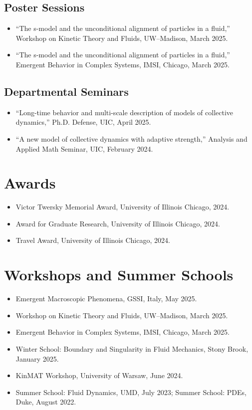 \documentclass[10pt]{article}
\begin{document}
\subsection*{Poster Sessions}
\begin{itemize}
  \item ``The s-model and the unconditional alignment of particles in a fluid,'' Workshop on Kinetic Theory and Fluids, UW--Madison, March 2025.
  \item ``The s-model and the unconditional alignment of particles in a fluid,'' Emergent Behavior in Complex Systems, IMSI, Chicago, March 2025.
\end{itemize}

\subsection*{Departmental Seminars}
\begin{itemize}
  \item ``Long-time behavior and multi-scale description of models of collective dynamics,'' Ph.D. Defense, UIC, April 2025.
  \item ``A new model of collective dynamics with adaptive strength,'' Analysis and Applied Math Seminar, UIC, February 2024.
\end{itemize}

\section*{Awards}
\begin{itemize}
  \item Victor Twersky Memorial Award, University of Illinois Chicago, 2024.
  \item Award for Graduate Research, University of Illinois Chicago, 2024.
  \item Travel Award, University of Illinois Chicago, 2024.
\end{itemize}

\section*{Workshops and Summer Schools}
\begin{itemize}
  \item Emergent Macroscopic Phenomena, GSSI, Italy, May 2025.
  \item Workshop on Kinetic Theory and Fluids, UW--Madison, March 2025.
  \item Emergent Behavior in Complex Systems, IMSI, Chicago, March 2025.
  \item Winter School: Boundary and Singularity in Fluid Mechanics, Stony Brook, January 2025.
  \item KinMAT Workshop, University of Warsaw, June 2024.
  \item Summer School: Fluid Dynamics, UMD, July 2023; Summer School: PDEs, Duke, August 2022.
\end{itemize}
\end{document}
